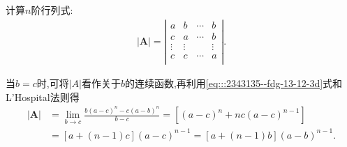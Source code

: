 \documentclass[../../main.tex]{subfiles}%
\begin{document}
\begin{proposition}\label{proposition:常见行列式1}
计算$n$阶行列式:
\begin{align*}
|\boldsymbol{A}|=\left| \begin{matrix}
a&		b&		\cdots&		b\\
c&		a&		\cdots&		b\\
\vdots&		\vdots&		&		\vdots\\
c&		c&		\cdots&		a\\
\end{matrix} \right|.
\end{align*}
\end{proposition}
\begin{remark}
当$b=c$时,可将$|A|$看作关于$b$的连续函数,再利用\eqref{eq:::2343135--fdg-13-12-3d}式和L'Hospital法则得
\begin{align*}
\left| \boldsymbol{A} \right|&=\underset{b\rightarrow c}{\lim}\frac{b\left( a-c \right) ^n-c\left( a-b \right) ^n}{b-c}=\left[ \left( a-c \right) ^n+nc\left( a-c \right) ^{n-1} \right] 
\\
&=\left[ a+\left( n-1 \right) c \right] \left( a-c \right) ^{n-1}=\left[ a+\left( n-1 \right) b \right] \left( a-b \right) ^{n-1}.
\end{align*}
\end{remark}
\end{document}

